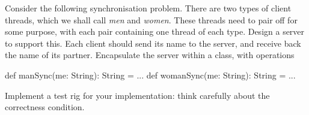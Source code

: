 \begin{question}
\label{ex:menWomenServer}
Consider the following synchronisation problem.  There are two
types of client threads, which we shall call \emph{men} and \emph{women}.
These threads need to pair off for some purpose, with each pair containing
one thread of each type.
%
Design a server  to support this.  Each client should send its name to
the server, and receive back the name of its partner.  Encapsulate the server
within a class, with operations
\begin{scala}
  def manSync(me: String): String = ...
  def womanSync(me: String): String = ...
\end{scala}

Implement a test rig for your implementation: think carefully about the
correctness condition. 
\end{question}


